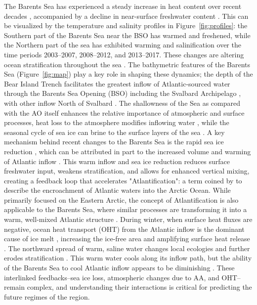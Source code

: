 \documentclass[draft]{agujournal2019}
\begin{document}
The Barents Sea has experienced a steady increase in heat content over recent decades \cite{Smedsrud2013,Bianco2024}, accompanied by a decline in near-surface freshwater content \cite{Watelet2020}. This can be visualized by the temperature and salinity profiles in Figure~\ref{fig:profiles}: the Southern part of the Barents Sea near the BSO has warmed and freshened, while the Northern part of the sea has exhibited warming and salinification over the time periods 2003--2007, 2008--2012, and 2013--2017. These changes are altering ocean stratification throughout the sea \cite{Lind2018,Hordoir2022}. The bathymetric features of the Barents Sea (Figure~\ref{fig:map}) play a key role in shaping these dynamics; the depth of the Bear Island Trench facilitates the greatest inflow of Atlantic-sourced water through the Barents Sea Opening (BSO) including the Svalbard Archipelago \cite{Kalhagen2024}, with other inflow North of Svalbard \cite{Lind2012,Lundesgaard2022}. The shallowness of the Sea as compared with the AO itself enhances the relative importance of atmospheric and surface processes, heat loss to the atmosphere modifies inflowing water \cite{arthun2010}, while the seasonal cycle of sea ice can brine to the surface layers of the sea \cite{schauer2002}. A key mechanism behind recent changes to the Barents Sea is the rapid sea ice reduction \cite{Rieke2023}, which can be attributed in part to the increased volume and warming of Atlantic inflow \cite{Smedsrud2010,Onarheim2018,Smedsrud2022}. This warm inflow and sea ice reduction reduces surface freshwater input, weakens stratification, and allows for enhanced vertical mixing, creating a feedback loop that accelerates "Atlantification": a term coined by  to describe the encroachment of Atlantic waters into the Arctic Ocean. While  primarily focused on the Eastern Arctic, the concept of Atlantification is also applicable to the Barents Sea, where similar processes are transforming it into a warm, well-mixed Atlantic structure \cite{Arthun2012,Gerland2023}. During winter, when surface heat fluxes are negative, ocean heat transport (OHT) from the Atlantic inflow is the dominant cause of ice melt \cite{Ivanov2012,Tsubouchi2021}, increasing the ice-free area and amplifying surface heat release \cite{Skagseth2020}. The northward spread of warm, saline water \cite{Oziel2016} changes local ecologies \cite{Bogstad2015,Dalpadado2014,Ingvaldsen2021} and further erodes stratification \cite{Lind2018}. This warm water cools along its inflow path, but the ability of the Barents Sea to cool Atlantic inflow appears to be diminishing \cite{Shu2021,Skagseth2020}. These interlinked feedbacks--sea ice loss, atmospheric changes due to AA, and OHT--remain complex, and understanding their interactions is critical for predicting the future regimes of the region.
\end{document}
